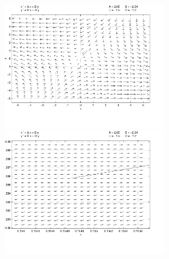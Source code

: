 \documentclass{ximera}
\begin{document}
\begin{computerExercise}
\begin{solution}
\begin{figure}[htb]
                       \centerline{%
                       \includegraphics[width=2.75in]{exfigure/4-9-8a.pdf}
                       \includegraphics[width=2.75in]{exfigure/4-9-8b.pdf}}
\end{figure}



\end{solution}
\end{computerExercise}
\end{document}
